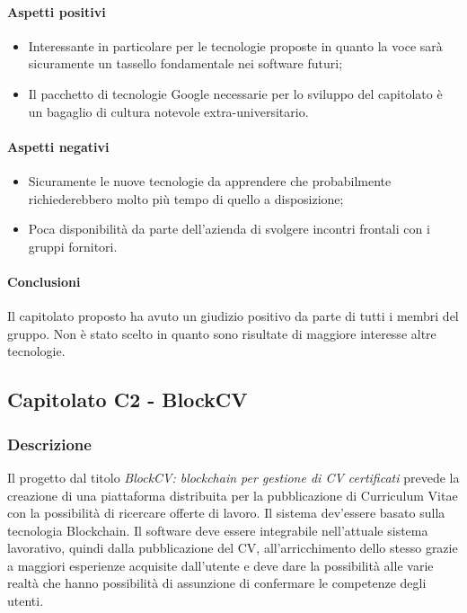 			\paragraph{Aspetti positivi} \Spazio
				\begin{itemize}
				\item {Interessante in particolare per le tecnologie proposte in quanto la voce sarà sicuramente un tassello fondamentale nei software futuri;}
				\item {Il pacchetto di tecnologie Google necessarie per lo sviluppo del capitolato è un bagaglio di cultura notevole extra-universitario.}	
			\end{itemize}
			\paragraph{Aspetti negativi} \Spazio
			\begin{itemize}
				\item {Sicuramente le nuove tecnologie da apprendere che probabilmente richiederebbero molto più tempo di quello a disposizione;}
				\item {Poca disponibilità da parte dell'azienda di svolgere incontri frontali con i gruppi fornitori.}	
			\end{itemize} 
			\paragraph{Conclusioni} \Spazio
			Il capitolato proposto ha avuto un giudizio positivo da parte di tutti i membri del gruppo. Non è stato scelto in quanto sono risultate di maggiore interesse altre tecnologie.
			
	\subsection{Capitolato C2 - BlockCV}
	\subsubsection{Descrizione}
	Il progetto dal titolo \emph{BlockCV: blockchain per gestione di CV certificati} prevede la creazione di una piattaforma distribuita per la pubblicazione di Curriculum Vitae con la possibilità di ricercare offerte di lavoro. Il sistema dev'essere basato sulla tecnologia Blockchain.
	Il software deve essere integrabile nell'attuale sistema lavorativo, quindi dalla pubblicazione del CV, all'arricchimento dello stesso grazie a maggiori esperienze acquisite dall'utente e deve dare la possibilità alle varie realtà che hanno possibilità di assunzione di confermare le competenze degli utenti.    
